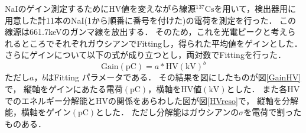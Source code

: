 NaIのゲイン測定するためにHV値を変えながら線源$^{137}\mathrm{Cs}$を用いて，検出器用に用意した計11本のNaI(1から順番に番号を付けた)の電荷を測定を行った．
この線源は661.7keVのガンマ線を放出する．\cite{IAEA_ENSDF}
そのため，これを光電ピークと考えられるところでそれぞれガウシアンでFittingし，得られた平均値をゲインとした．
さらにゲインについて以下の式が成り立つとし，両対数でFittingを行った．\cite{Hamamatsu_PMT}
\begin{equation}
\mathrm{Gain}(\mathrm{pC})=a*\mathrm{HV}(\mathrm{kV})^b  
\end{equation}
ただし$a， b$はFitting パラメータである．
その結果を図にしたものが図\ref{GainHV}で，
縦軸をゲインにあたる電荷$(\mathrm{pC})$，横軸をHV値$(\mathrm{kV})$とした．
また各HVでのエネルギー分解能とHVの関係をあらわした図が図\ref{HVreso}で，
縦軸を分解能，横軸をゲイン$(\mathrm{pC})$とした．
ただし分解能はガウシアンの$\sigma$を電荷で割ったものある．
